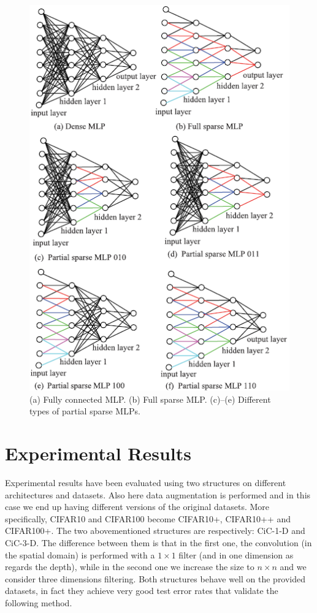 \begin{figure}[h!]
    \centering
    \includegraphics[scale=0.85]{images/07_1.png}
    \caption{(a) Fully connected MLP. (b) Full sparse MLP. (c)–(e) Different types of partial sparse MLPs.}
    \label{fig:07_1}
\end{figure}

\FloatBarrier

\section{Experimental Results}

Experimental results have been evaluated using two structures on different architectures and datasets. Also here data augmentation is performed and in this case we end up having different versions of the original datasets. More specifically, CIFAR10 \citep{CIFAR10and100} and CIFAR100 \citep{CIFAR10and100} become CIFAR10+, CIFAR10++ and CIFAR100+. The two abovementioned structures are respectively: CiC-1-D and CiC-3-D. The difference between them is that in the first one, the convolution (in the spatial domain) is performed with a $1 \times 1$ filter (and in one dimension as regards the depth), while in the second one we increase the size to $n \times n$ and we consider three dimensions filtering. Both structures behave well on the provided datasets, in fact they achieve very good test error rates that validate the following method. 
